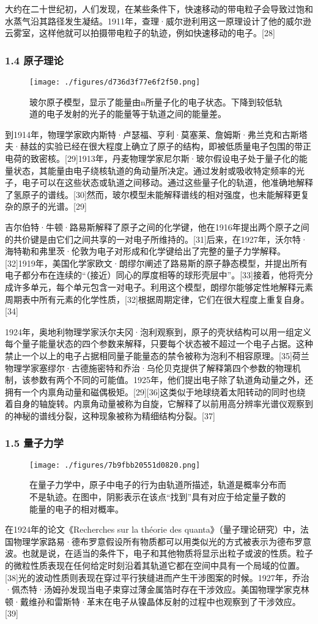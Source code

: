 大约在二十世纪初，人们发现，在某些条件下，快速移动的带电粒子会导致过饱和水蒸气沿其路径发生凝结。1911年，查理·威尔逊利用这一原理设计了他的威尔逊云雾室，这样他就可以拍摄带电粒子的轨迹，例如快速移动的电子。[28]
\subsubsection{1.4 原子理论}
\begin{figure}[ht]
\centering
\texttt{[image: ./figures/d736d3f77e6f2f50.png]}
\caption{玻尔原子模型，显示了能量由n所量子化的电子状态。下降到较低轨道的电子发射的光子的能量等于轨道之间的能量差。} \label{fig_DZ_3}
\end{figure}
到1914年，物理学家欧内斯特·卢瑟福、亨利·莫塞莱、詹姆斯·弗兰克和古斯塔夫·赫兹的实验已经在很大程度上确立了原子的结构，即被低质量电子包围的带正电荷的致密核。[29]1913年，丹麦物理学家尼尔斯·玻尔假设电子处于量子化的能量状态，其能量由电子绕核轨道的角动量所决定。通过发射或吸收特定频率的光子，电子可以在这些状态或轨道之间移动。通过这些量子化的轨道，他准确地解释了氢原子的谱线。[30]然而，玻尔模型未能解释谱线的相对强度，也未能解释更复杂的原子的光谱。[29]

吉尔伯特·牛顿·路易斯解释了原子之间的化学键，他在1916年提出两个原子之间的共价键是由它们之间共享的一对电子所维持的。[31]后来，在1927年，沃尔特·海特勒和弗里茨·伦敦为电子对形成和化学键给出了完整的量子力学解释。[32]1919年，美国化学家欧文·朗缪尔阐述了路易斯的原子静态模型，并提出所有电子都分布在连续的“（接近）同心的厚度相等的球形壳层中”。[33]接着，他将壳分成许多单元，每个单元包含一对电子。利用这个模型，朗缪尔能够定性地解释元素周期表中所有元素的化学性质，[32]根据周期定律，它们在很大程度上重复自身。[34]

1924年，奥地利物理学家沃尔夫冈·泡利观察到，原子的壳状结构可以用一组定义每个量子能量状态的四个参数来解释，只要每个状态被不超过一个电子占据。这种禁止一个以上的电子占据相同量子能量态的禁令被称为泡利不相容原理。[35]荷兰物理学家塞缪尔·古德施密特和乔治·乌伦贝克提供了解释第四个参数的物理机制，该参数有两个不同的可能值。1925年，他们提出电子除了轨道角动量之外，还拥有一个内禀角动量和磁偶极矩。[29][36]这类似于地球绕着太阳转动的同时也绕着自身的轴旋转。内禀角动量被称为自旋，它解释了以前用高分辨率光谱仪观察到的神秘的谱线分裂，这种现象被称为精细结构分裂。[37]
\subsubsection{1.5 量子力学}
\begin{figure}[ht]
\centering
\texttt{[image: ./figures/7b9fbb20551d0820.png]}
\caption{在量子力学中，原子中电子的行为由轨道所描述，轨道是概率分布而不是轨迹。在图中，阴影表示在该点“找到”具有对应于给定量子数的能量的电子的相对概率。} \label{fig_DZ_4}
\end{figure}
在1924年的论文《Recherches sur la théorie des quanta》（量子理论研究）中，法国物理学家路易·德布罗意假设所有物质都可以用类似光的方式被表示为德布罗意波。也就是说，在适当的条件下，电子和其他物质将显示出粒子或波的性质。粒子的微粒性质表现在任何给定时刻沿着其轨道它都在空间中具有一个局域的位置。[38]光的波动性质则表现在穿过平行狭缝进而产生干涉图案的时候。1927年，乔治·佩杰特·汤姆孙发现当电子束穿过薄金属箔时存在干涉效应。美国物理学家克林顿·戴维孙和雷斯特·革末在电子从镍晶体反射的过程中也观察到了干涉效应。[39]

